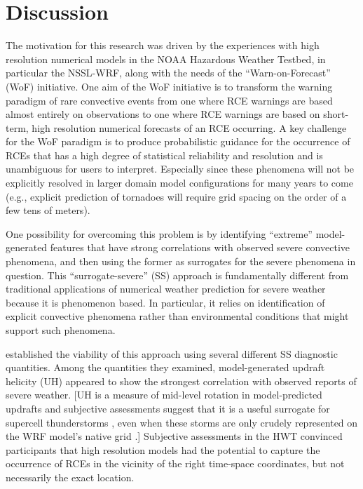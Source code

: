 

\chapter{Discussion}
\label{discussion}


The motivation for this research was driven by the experiences with high resolution numerical models in the NOAA Hazardous Weather Testbed, in particular the NSSL-WRF, along with the needs of the ``Warn-on-Forecast'' (WoF) initiative.
One aim of the WoF initiative is to transform the warning paradigm of rare convective events from one where RCE warnings are based almost entirely on observations to one where RCE warnings are based on short-term, high resolution numerical forecasts of an RCE occurring.
A key challenge for the WoF paradigm is to produce probabilistic guidance for the occurrence of RCEs that has a high degree of statistical reliability and resolution and is unambiguous for users to interpret.
Especially since these phenomena will not be explicitly resolved in larger domain model configurations for many years to come (e.g., explicit prediction of tornadoes will require grid spacing on the order of a few tens of meters).


One possibility for overcoming this problem is by identifying ``extreme'' model-generated features that have strong correlations with observed severe convective phenomena, and then using the former as surrogates for the severe phenomena in question.
This ``surrogate-severe'' (SS) approach is fundamentally different from traditional applications of numerical weather prediction for severe weather because it is phenomenon based.
In particular, it relies on identification of explicit convective phenomena rather than environmental conditions that might support such phenomena.


\cite{Sobash2011} established the viability of this approach using several different SS diagnostic quantities.
Among the quantities they examined, model-generated updraft helicity (UH) appeared to show the strongest correlation with observed reports of severe weather.
[UH is a measure of mid-level rotation in model-predicted updrafts and subjective assessments suggest that it is a useful surrogate for supercell thunderstorms \citep{Kain2010}, even when these storms are only crudely represented on the WRF model's native grid \citep{Kain2008}.]
Subjective assessments in the HWT convinced participants that high resolution models had the potential to capture the occurrence of RCEs in the vicinity of the right time-space coordinates, but not necessarily the exact location.


